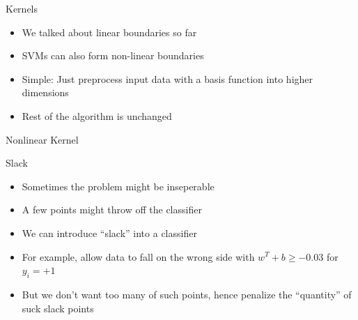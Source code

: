 \documentclass[12pt,fleqn]{article}\usepackage{../common}
\begin{document}
Kernels

\begin{itemize}
   \item We talked about linear boundaries so far
   \item SVMs can also form non-linear boundaries
   \item Simple: Just preprocess input data with a basis function into higher
   dimensions
   \item Rest of the algorithm is unchanged
\end{itemize}

Nonlinear Kernel


\begin{figure}[!hbp]
\caption{}
\end{figure}

Slack

\begin{itemize}
   \item Sometimes the problem might be inseperable
   \item A few points might throw off the classifier
   \item We can introduce ``slack'' into a classifier
   \item For example, allow data to fall on the wrong side with $w^{T}+b \geq
   -0.03$ for $y_{i}=+1$
   \item But we don't want too many of such points, hence penalize the
   ``quantity'' of suck slack points
\end{itemize}

\clearpage
\end{document}
